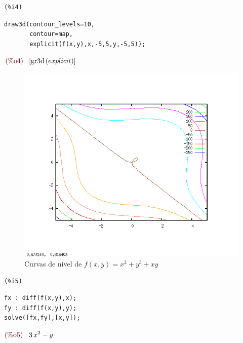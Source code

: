 \documentclass[12pt]{article}
\begin{document}
\noindent
\begin{minipage}[t]{8ex}{\color{red}\bf
\begin{verbatim}
(%i4) 
\end{verbatim}}
\end{minipage}
\begin{minipage}[t]{\textwidth}{\color{blue}
\begin{verbatim}
draw3d(contour_levels=10,
       contour=map,
       explicit(f(x,y),x,-5,5,y,-5,5));
\end{verbatim}}
\end{minipage}
\begin{math}\displaystyle
\parbox{8ex}{\color{labelcolor}(\%o4) }
[\mathrm{gr3d}\left( explicit\right) ]
\end{math}
\begin{figure}[H]
\centering
\includegraphics[scale=0.5]{8.png}
\caption{Curvas de nivel de $f(x,y)= x^3+y^3+xy$ }
\end{figure}


\noindent
\begin{minipage}[t]{8ex}{\color{red}\bf
\begin{verbatim}
(%i5) 
\end{verbatim}}
\end{minipage}
\begin{minipage}[t]{\textwidth}{\color{blue}
\begin{verbatim}
fx : diff(f(x,y),x);
fy : diff(f(x,y),y);
solve([fx,fy],[x,y]);
\end{verbatim}}
\end{minipage}
\begin{math}\displaystyle
\parbox{8ex}{\color{labelcolor}(\%o5) }
3\,{x}^{2}-y
\end{math}
\end{document}
